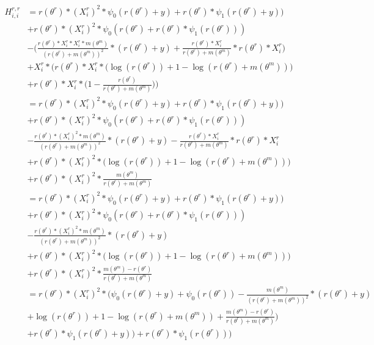 \documentclass[bibliography=totoc,10pt]{scrartcl}
\begin{document}
\begin{equation}
\begin{split}
H^{r,r}_{i,i} &= r(\theta^r) * (X^r_{i})^2 * \psi_0(r(\theta^r)+y) +  r(\theta^r) *  \psi_1(r(\theta^r)+y) ) \\
&+ r(\theta^r) * (X^r_{i})^2 * \psi_0(r(\theta^r) +  r(\theta^r) *  \psi_1(r(\theta^r)) ) \\
&- \bigg( \frac{r(\theta^r) * X^r_{i} * X^r_{i}* m(\theta^m) }{(r(\theta^r)+m(\theta^m))^2} *(r(\theta^r) + y) + \frac{r(\theta^r) * X^r_{i} }{r(\theta^r)+m(\theta^m)} *r(\theta^r) * X^r_{i} \bigg) \\
&+ X^r_{i} * \bigg(  r(\theta^r) * X^r_{i} * \bigg( \log(r(\theta^r)) + 1 - \log(r(\theta^r)+m(\theta^m)) \bigg) \\
&+ r(\theta^r) *X^r_{i} * \bigg( 1 - \frac{r(\theta^r)}{r(\theta^r)+m(\theta^m)} \bigg)  \bigg) \\
&= r(\theta^r) * (X^r_{i})^2 * \psi_0(r(\theta^r)+y) +  r(\theta^r) *  \psi_1(r(\theta^r)+y) ) \\
&+ r(\theta^r) * (X^r_{i})^2 * \psi_0(r(\theta^r) +  r(\theta^r) *  \psi_1(r(\theta^r)) ) \\
&- \frac{r(\theta^r) * (X^r_{i})^2 * m(\theta^m) }{(r(\theta^r)+m(\theta^m))^2} *(r(\theta^r) + y) - \frac{r(\theta^r) * X^r_{i} }{r(\theta^r)+m(\theta^m)} *r(\theta^r) * X^r_{i}  \\
&+ r(\theta^r) * (X^r_{i})^2 * \bigg( \log(r(\theta^r)) + 1 - \log(r(\theta^r)+m(\theta^m)) \bigg) \\
&+ r(\theta^r) * (X^r_{i})^2 * \frac{m(\theta^m)}{r(\theta^r)+m(\theta^m)} \\
&= r(\theta^r) * (X^r_{i})^2 * \psi_0(r(\theta^r)+y) +  r(\theta^r) *  \psi_1(r(\theta^r)+y) ) \\
&+ r(\theta^r) * (X^r_{i})^2 * \psi_0(r(\theta^r) +  r(\theta^r) *  \psi_1(r(\theta^r)) ) \\
&- \frac{r(\theta^r) * (X^r_{i})^2 * m(\theta^m) }{(r(\theta^r)+m(\theta^m))^2} *(r(\theta^r) + y) \\
&+ r(\theta^r) * (X^r_{i})^2 * \bigg( \log(r(\theta^r)) + 1 - \log(r(\theta^r)+m(\theta^m)) \bigg) \\
&+ r(\theta^r) * (X^r_{i})^2 * \frac{m(\theta^m)-r(\theta^r)}{r(\theta^r)+m(\theta^m)} \\
&= r(\theta^r) * (X^r_{i})^2 * \bigg( \psi_0(r(\theta^r)+y) +  \psi_0(r(\theta^r)) -  \frac{m(\theta^m) }{(r(\theta^r)+m(\theta^m))^2} *(r(\theta^r) + y) \\
&+ \log(r(\theta^r)) + 1 - \log(r(\theta^r)+m(\theta^m)) + \frac{m(\theta^m)-r(\theta^r)}{r(\theta^r)+m(\theta^m)} \bigg) \\
&+  r(\theta^r) *  \psi_1(r(\theta^r)+y) ) + r(\theta^r) *  \psi_1(r(\theta^r)) ) \\
\end{split}
\end{equation}
\end{document}
